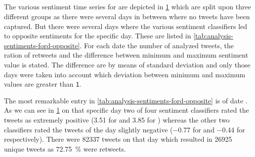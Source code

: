 \subsection{\ford}
\label{ss:analysis-sentiments-ford}

The various sentiment time series for \ford{} are depicted in \cref{fig:analysis-sentiments-ford} which are split upon three different groups as there were several days in between where no tweets have been captured.
But there were several days where the various sentiment classifiers led to opposite sentiments for the specific day.
These are listed in \cref{tab:analysis-sentiments-ford-opposite}.
For each date the number of analyzed tweets, the ration of retweets and the difference between minimum and maximum sentiment value is stated.
The difference are by means of standard deviation and only those days were taken into account which deviation between minimum and maximum values are greater than \texttt{1}.

\begin{figure}[hbt]
    \centering
    
    \caption{\sentimentsCaption{\ford}}
    \label{fig:analysis-sentiments-ford}
\end{figure} 


The most remarkable entry in \cref{tab:analysis-sentiments-ford-opposite} is of date .
As we can see in \cref{fig:analysis-sentiments-ford} on that specific day two of four sentiment classifiers rated the tweets as extremely positive (\num{3.51} for \ftb{} and \num{3.85} for \fme{}) whereas the other two classifiers rated the tweets of the day slightly negative (\num{-0.77} for \fnb{} and \num{-0.44} for \fsvm{} respectively).
There were \num{82337} tweets on that day which resulted in \num{26925} unique tweets as \SI{72.75}{\percent} were retweets.

